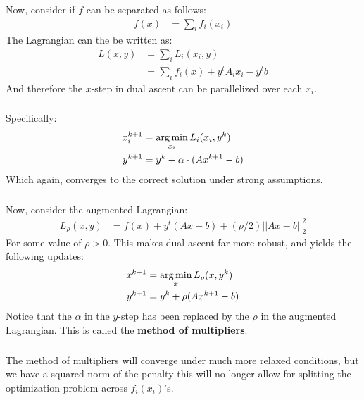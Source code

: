 \begin{frame}[fragile] \frametitle{}

Now, consider if $f$ can be separated as follows:
\begin{align*}
f(x) &= \sum_i f_i (x_i)
\end{align*}
The Lagrangian can the be written as:
\begin{align*}
L(x,y) &= \sum_i L_i (x_i, y) \\
&= \sum_i f_i(x) + y^t A_i x_i - y^t b
\end{align*}
And therefore the $x$-step in dual ascent can be parallelized over each
$x_i$.

\end{frame}

\begin{frame}[fragile] \frametitle{}

Specifically:
\begin{align*}
x^{k+1}_i &= \mathop{\mathrm{arg\,min}}_{x_i} L_i(x_i, y^k) \\
y^{k+1} &= y^{k} + \alpha \cdot (A x^{k+1} - b)
\end{align*}
Which again, converges to the correct solution under strong assumptions.

\end{frame}

\begin{frame}[fragile] \frametitle{}

Now, consider the augmented Lagrangian:
\begin{align*}
L_\rho (x, y) &= f(x) + y^t (Ax - b) + \left(\rho / 2\right)|| Ax - b ||_2^2
\end{align*}
For some value of $\rho > 0$. This makes dual ascent far more robust, and yields
the following updates:
\begin{align*}
x^{k+1} &= \mathop{\mathrm{arg\,min}}_x L_\rho (x, y^{k}) \\
y^{k+1} &= y^k + \rho (A x^{k+1} - b)
\end{align*}
Notice that the $\alpha$ in the $y$-step has been replaced by the $\rho$
in the augmented Lagrangian. This is called the \textbf{method of multipliers}.

\end{frame}

\begin{frame}[fragile] \frametitle{}

The method of multipliers will converge under much more relaxed conditions, but
we have a squared norm of the penalty this will no longer allow for splitting the
optimization problem across $f_i(x_i)$'s.

\end{frame}

